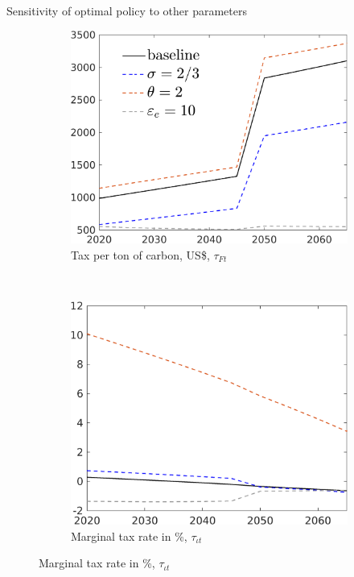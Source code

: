 \documentclass[11pt,aspectratio=169]{beamer}
\begin{document}
\begin{frame}{Sensitivity of optimal policy to other parameters}
\hypertarget{sensother}{}
\vspace{-3mm}
\begin{figure}[h!!]
	
	\begin{subfigure}{0.4\textwidth}		
		\caption{Tax per ton of carbon,  US\$, $\tau_{Ft}$}
		\includegraphics[width=1\textwidth]{../codding_model/own_basedOnFried/optimalPol_010922_revision/figures/all_13Sept22/SensOther_Tauf_spillover0_knspil0_xgr0_nsk0_sep0_extern0_PV1_etaa0.79_lgd1.png}
	\end{subfigure}	
	\begin{minipage}[]{0.1\textwidth}
		\ 
	\end{minipage}
	\begin{subfigure}{0.4\textwidth}		
		\caption{Marginal tax rate in \%, $\tau_{\iota t}$}
		\includegraphics[width=1\textwidth]{../codding_model/own_basedOnFried/optimalPol_010922_revision/figures/all_13Sept22/SensOther_dTaulAv_spillover0_knspil0_xgr0_nsk0_sep0_extern0_PV1_etaa0.79_lgd0.png}

\end{subfigure}
\end{figure}
\end{frame}
\end{document}
